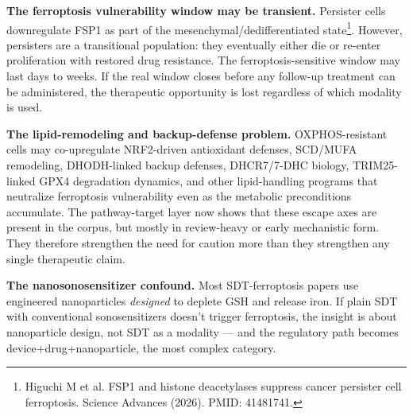 \documentclass[11pt,twoside,openright]{report}
\begin{document}
\textbf{The ferroptosis vulnerability window may be transient.} Persister cells downregulate FSP1 as part of the mesenchymal/dedifferentiated state\footnote{Higuchi M et al. FSP1 and histone deacetylases suppress cancer persister cell ferroptosis. Science Advances (2026). PMID: 41481741.}. However, persisters are a transitional population: they eventually either die or re-enter proliferation with restored drug resistance. The ferroptosis-sensitive window may last days to weeks. If the real window closes before any follow-up treatment can be administered, the therapeutic opportunity is lost regardless of which modality is used.

\textbf{The lipid-remodeling and backup-defense problem.} OXPHOS-resistant cells may co-upregulate NRF2-driven antioxidant defenses, SCD/MUFA remodeling, DHODH-linked backup defenses, DHCR7/7-DHC biology, TRIM25-linked GPX4 degradation dynamics, and other lipid-handling programs that neutralize ferroptosis vulnerability even as the metabolic preconditions accumulate. The pathway-target layer now shows that these escape axes are present in the corpus, but mostly in review-heavy or early mechanistic form. They therefore strengthen the need for caution more than they strengthen any single therapeutic claim.

\textbf{The nanosonosensitizer confound.} Most SDT-ferroptosis papers use engineered nanoparticles \textit{designed} to deplete GSH and release iron. If plain SDT with conventional sonosensitizers doesn't trigger ferroptosis, the insight is about nanoparticle design, not SDT as a modality --- and the regulatory path becomes device+drug+nanoparticle, the most complex category.
\end{document}
